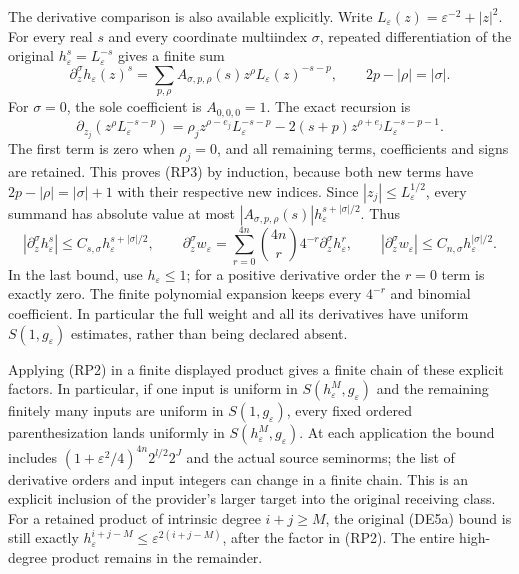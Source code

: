 \documentclass[
  11pt,
]{article}
\begin{document}
The derivative comparison is also available explicitly. Write
\(L_\varepsilon(z)=\varepsilon^{-2}+|z|^2\). For every real \(s\) and
every coordinate multiindex \(\sigma\), repeated differentiation of the
original \(h_\varepsilon^s=L_\varepsilon^{-s}\) gives a finite sum \[
 \partial_z^\sigma h_\varepsilon(z)^s
   =\sum_{p,\rho} A_{\sigma,p,\rho}(s)
                  z^\rho L_\varepsilon(z)^{-s-p},\qquad
        2p-|\rho|=|\sigma|.
 \tag{RP3}
\] For \(\sigma=0\), the sole coefficient is \(A_{0,0,0}=1\). The exact
recursion is \[
 \partial_{z_j}\!\left(z^\rho L_\varepsilon^{-s-p}\right)
  =\rho_j z^{\rho-e_j}L_\varepsilon^{-s-p}
    -2(s+p)z^{\rho+e_j}L_\varepsilon^{-s-p-1}.
 \tag{RP4}
\] The first term is zero when \(\rho_j=0\), and all remaining terms,
coefficients and signs are retained. This proves (RP3) by induction,
because both new terms have \(2p-|\rho|=|\sigma|+1\) with their
respective new indices. Since \(|z_j|\leq L_\varepsilon^{1/2}\), every
summand has absolute value at most
\(|A_{\sigma,p,\rho}(s)|h_\varepsilon^{s+|\sigma|/2}\). Thus \[
 |\partial_z^\sigma h_\varepsilon^s|
       \leq C_{s,\sigma}h_\varepsilon^{s+|\sigma|/2},\qquad
 \partial_z^\sigma w_\varepsilon
   =\sum_{r=0}^{4n}\binom{4n}{r}4^{-r}
                    \partial_z^\sigma h_\varepsilon^r,
 \qquad
 |\partial_z^\sigma w_\varepsilon|
       \leq C_{n,\sigma}h_\varepsilon^{|\sigma|/2}.
 \tag{RP5}
\] In the last bound, use \(h_\varepsilon\leq1\); for a positive
derivative order the \(r=0\) term is exactly zero. The finite polynomial
expansion keeps every \(4^{-r}\) and binomial coefficient. In particular
the full weight and all its derivatives have uniform
\(S(1,g_\varepsilon)\) estimates, rather than being declared absent.

Applying (RP2) in a finite displayed product gives a finite chain of
these explicit factors. In particular, if one input is uniform in
\(S(h_\varepsilon^M,g_\varepsilon)\) and the remaining finitely many
inputs are uniform in \(S(1,g_\varepsilon)\), every fixed ordered
parenthesization lands uniformly in
\(S(h_\varepsilon^M,g_\varepsilon)\). At each application the bound
includes \((1+\varepsilon^2/4)^{4n}2^{l/2}2^J\) and the actual source
seminorms; the list of derivative orders and input integers can change
in a finite chain. This is an explicit inclusion of the provider's
larger target into the original receiving class. For a retained product
of intrinsic degree \(i+j\geq M\), the original (DE5a) bound is still
exactly \(h_\varepsilon^{i+j-M}\leq\varepsilon^{2(i+j-M)}\), after the
factor in (RP2). The entire high-degree product remains in the
remainder.
\end{document}
